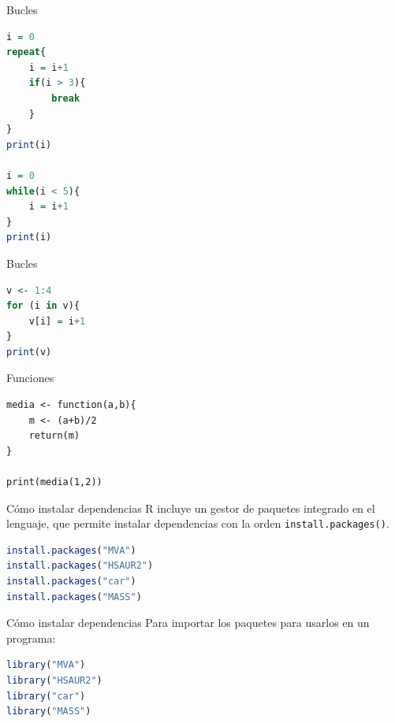 \documentclass[xcolor=table]{beamer}
\begin{document}
\begin{frame}[fragile]{Bucles}
\begin{lstlisting}[language=R, basicstyle=\ttfamily]
i = 0
repeat{
    i = i+1
    if(i > 3){
        break
    }
}
print(i)

i = 0
while(i < 5){
    i = i+1
}
print(i)

\end{lstlisting}

\end{frame}

\begin{frame}[fragile]{Bucles}
\begin{lstlisting}[language=R, basicstyle=\ttfamily]
v <- 1:4
for (i in v){
    v[i] = i+1
}
print(v)
\end{lstlisting}

\end{frame}

\begin{frame}[fragile]{Funciones}
\begin{lstlisting}
media <- function(a,b){
    m <- (a+b)/2
    return(m)
}

print(media(1,2))
\end{lstlisting}
\end{frame}




\begin{frame}[fragile]{Cómo instalar dependencias}
R incluye un gestor de paquetes integrado en el lenguaje, que permite instalar dependencias con la orden \texttt{install.packages()}.
  
\begin{lstlisting}[language=R, basicstyle=\ttfamily]
install.packages("MVA")
install.packages("HSAUR2")
install.packages("car")
install.packages("MASS")
\end{lstlisting}

\end{frame}

\begin{frame}[fragile]{Cómo instalar dependencias}
Para importar los paquetes para usarlos en un programa:  
\begin{lstlisting}[language=R, basicstyle=\ttfamily]
library("MVA")
library("HSAUR2")
library("car")
library("MASS")
\end{lstlisting}

\end{frame}
\end{document}
